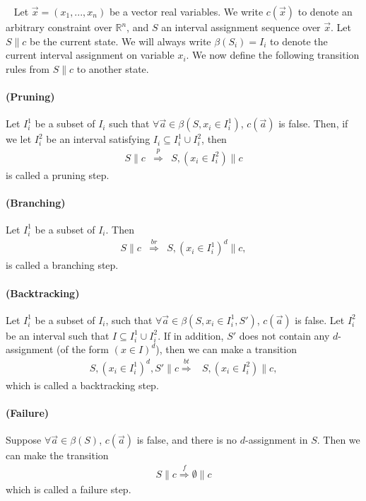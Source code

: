 \documentclass[12pt]{article}
\begin{document}
\begin{definition}~\label{transitions} Let $\vec x =
(x_1,...,x_n)$ be a vector real variables. We write $c(\vec x)$ to denote an
arbitrary constraint over $\mathbb{R}^n$, and
$S$ an interval assignment sequence over $\vec x$. Let $S\parallel c$ be the
current state. We will always write $\beta(S_i) = I_i$ to denote the current
interval assignment on variable $x_i$. We now define the following transition
rules from $S\parallel c$ to another state.
\paragraph{(Pruning)} Let $I_i^1$ be a subset of $I_i$ such that $\forall \vec
a\in \beta(S,x_i\in I_i^1)$, $c(\vec a)$ is false. Then, if we let $I_i^2$ be an
interval satisfying $I_i\subseteq I_i^1 \cup I_i^2$, then
\begin{eqnarray*}
S\parallel c &\stackrel{p}{\Longrightarrow}& S, (x_i\in I_i^2)\parallel c
\end{eqnarray*}
is called a pruning step.
\paragraph{(Branching)}Let $I_i^1$ be a subset of $I_i$. Then
\begin{eqnarray*}
S\parallel c &\stackrel{br}{\Longrightarrow}& S, (x_i\in I_i^1)^d \parallel c,
\end{eqnarray*}
is called a branching step.

\paragraph{(Backtracking)} Let $I_i^1$ be a subset of $I_i$, such that $\forall
\vec a\in \beta(S,x_i\in I_i^1, S')$, $c(\vec a)$ is false. Let $I_i^2$ be an
interval such that $I\subseteq I_i^1\cup I_i^2$. If in addition, $S'$ does not
contain any $d$-assignment (of the form $(x\in I)^d$), then we can make
a transition
\begin{eqnarray*}
S, (x_i\in I_i^1)^d, S'\parallel c \stackrel{bt}{\Longrightarrow}& S, (x_i\in
 I_i^2) \parallel c,
\end{eqnarray*}
which is called a backtracking step.

\paragraph{(Failure)} Suppose $\forall \vec a\in \beta(S)$, $c(\vec a)$ is
false, and there is no $d$-assignment in $S$. Then we can make the transition
\begin{eqnarray*}
S\parallel c \stackrel{f}{\Longrightarrow} \emptyset\parallel c
\end{eqnarray*}
which is called a failure step.
\end{definition}
\end{document}
